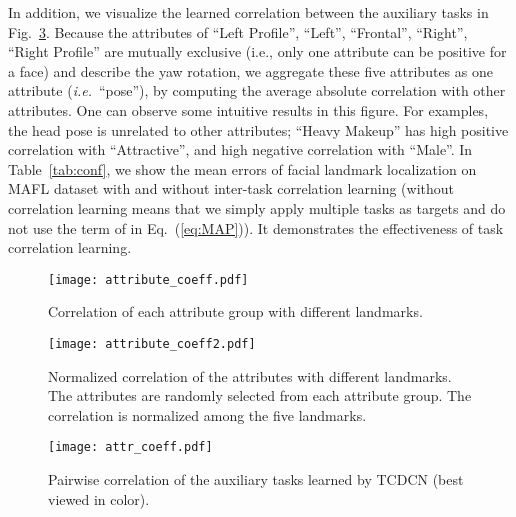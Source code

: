 \documentclass[10pt,journal,compsoc]{IEEEtran}
\newcommand{\ie}{\emph{i.e.}~}
\begin{document}
In addition, we visualize the learned correlation between the auxiliary tasks in Fig.~\ref{fig:attr_coeff}. Because the attributes of ``Left Profile'', ``Left'', ``Frontal'', ``Right'', ``Right Profile'' are mutually exclusive (i.e., only one attribute can be positive for a face) and describe the yaw rotation, we aggregate these five attributes as one attribute (\ie ``pose''), by computing the average absolute correlation with other attributes. One can observe some intuitive results in this figure. For examples, the head pose is unrelated to other attributes; ``Heavy Makeup'' has high positive correlation with ``Attractive'', and high negative correlation with ``Male''. In Table~\ref{tab:conf}, we show the mean errors of facial landmark localization on MAFL dataset with and without inter-task correlation learning (without correlation learning means that we simply apply multiple tasks as targets and do not use the term of  in Eq.~(\ref{eq:MAP})). It demonstrates the effectiveness of task correlation learning.

\begin{figure}
  \centering
  \texttt{[image: attribute\_coeff.pdf]}
  \vskip -0.35cm
  \caption{Correlation of each attribute group with different landmarks.}
  \label{fig:attribute_coeff}
\end{figure}

\begin{figure}
  \centering
  \texttt{[image: attribute\_coeff2.pdf]}
    \vskip -0.35cm
  \caption{Normalized correlation of the attributes with different landmarks. The attributes are randomly selected from each attribute group. The correlation is normalized among the five landmarks.}
  \label{fig:attribute_coeff2}
  \vskip -0.3cm
\end{figure}





\begin{figure}[t]
  \centering
  \texttt{[image: attr\_coeff.pdf]}
  \vskip -0.3cm
  \caption{Pairwise correlation of the auxiliary tasks learned by TCDCN (best viewed in color).}
  \label{fig:attr_coeff}
  \vskip -0.3cm
\end{figure}
\end{document}
